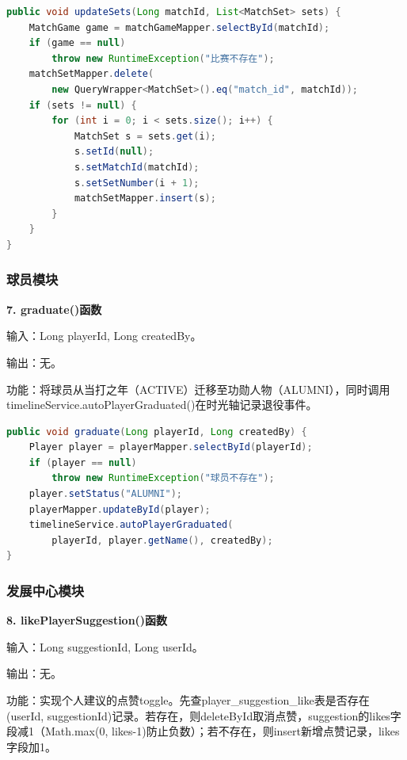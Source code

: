 \documentclass[12pt,a4paper]{ctexart}
\begin{document}
\begin{lstlisting}[language=Java]
public void updateSets(Long matchId, List<MatchSet> sets) {
    MatchGame game = matchGameMapper.selectById(matchId);
    if (game == null)
        throw new RuntimeException("比赛不存在");
    matchSetMapper.delete(
        new QueryWrapper<MatchSet>().eq("match_id", matchId));
    if (sets != null) {
        for (int i = 0; i < sets.size(); i++) {
            MatchSet s = sets.get(i);
            s.setId(null);
            s.setMatchId(matchId);
            s.setSetNumber(i + 1);
            matchSetMapper.insert(s);
        }
    }
}
\end{lstlisting}

\subsubsection{球员模块}

\textbf{7. graduate()函数}

输入：Long playerId, Long createdBy。

输出：无。

功能：将球员从当打之年（ACTIVE）迁移至功勋人物（ALUMNI），同时调用timelineService.autoPlayerGraduated()在时光轴记录退役事件。

\begin{lstlisting}[language=Java]
public void graduate(Long playerId, Long createdBy) {
    Player player = playerMapper.selectById(playerId);
    if (player == null)
        throw new RuntimeException("球员不存在");
    player.setStatus("ALUMNI");
    playerMapper.updateById(player);
    timelineService.autoPlayerGraduated(
        playerId, player.getName(), createdBy);
}
\end{lstlisting}

\subsubsection{发展中心模块}

\textbf{8. likePlayerSuggestion()函数}

输入：Long suggestionId, Long userId。

输出：无。

功能：实现个人建议的点赞toggle。先查player\_suggestion\_like表是否存在(userId, suggestionId)记录。若存在，则deleteById取消点赞，suggestion的likes字段减1（Math.max(0, likes-1)防止负数）；若不存在，则insert新增点赞记录，likes字段加1。
\end{document}
